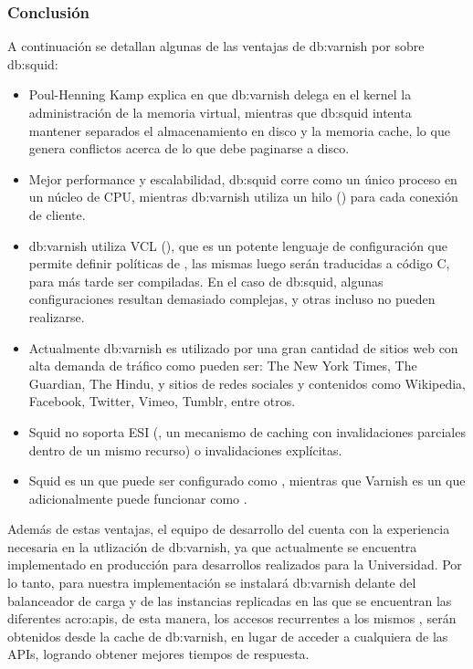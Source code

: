 \subsubsection{Conclusión}

A continuación se detallan algunas de las ventajas de \gls{db:varnish} por sobre \gls{db:squid}:

\begin{itemize}
  \item Poul-Henning Kamp explica en \cite{website:varnish-cache.org} que \gls{db:varnish} delega en el kernel la administración de la memoria virtual, mientras que \gls{db:squid} intenta mantener separados el almacenamiento en disco y la memoria cache, lo que genera conflictos acerca de lo que debe paginarse a disco.

  \item Mejor performance y escalabilidad, \gls{db:squid} corre como un único proceso en un núcleo de CPU, mientras \gls{db:varnish} utiliza un hilo () para cada conexión de cliente.

  \item \gls{db:varnish} utiliza VCL (), que es un potente lenguaje de configuración que permite definir políticas de , las mismas luego serán traducidas a código C, para más tarde ser compiladas.  En el caso de \gls{db:squid}, algunas configuraciones resultan demasiado complejas, y otras incluso no pueden realizarse.

  \item Actualmente \gls{db:varnish} es utilizado por una gran cantidad de sitios web con alta demanda de tráfico como pueden ser: The New York Times, The Guardian, The Hindu, y sitios de redes sociales y contenidos como Wikipedia, Facebook, Twitter, Vimeo, Tumblr, entre otros.

  \item Squid no soporta ESI (, un mecanismo de caching con invalidaciones parciales dentro de un mismo recurso) o invalidaciones explícitas.

  \item Squid es un  que puede ser configurado como , mientras que Varnish es un  que adicionalmente puede funcionar como .
\end{itemize}

Además de estas ventajas, el equipo de desarrollo del {\cespi} cuenta con la experiencia necesaria en la utlización de \gls{db:varnish}, ya que actualmente se encuentra implementado en producción para desarrollos realizados para la Universidad.  Por lo tanto, para nuestra implementación se instalará \gls{db:varnish} delante del balanceador de carga y de las instancias replicadas en las que se encuentran las diferentes \glspl{acro:api}, de esta manera, los accesos recurrentes a los mismos , serán obtenidos desde la cache de \gls{db:varnish}, en lugar de acceder a cualquiera de las APIs, logrando obtener mejores tiempos de respuesta.
